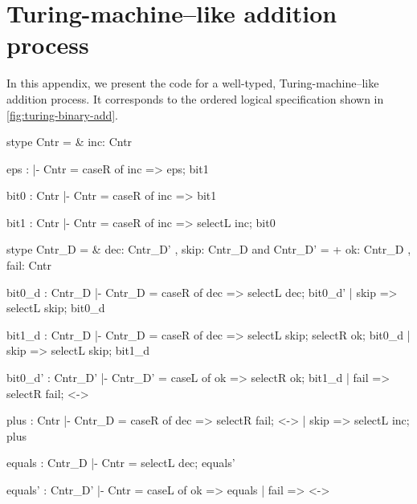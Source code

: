 \section{Turing-machine--like addition process}

In this appendix, we present the code for a well-typed, Turing-machine--like addition process.
It corresponds to the ordered logical specification shown in \cref{fig:turing-binary-add}.

\begin{sillcode*}[
  gobble=2
]
  stype Cntr = &{ inc: Cntr }
  
  eps : { |- Cntr } =
  { caseR of
      inc => eps; bit1 }
  
  bit0 : { Cntr |- Cntr } =
  { caseR of
      inc => bit1 }
  
  bit1 : { Cntr |- Cntr } =
  { caseR of
      inc => selectL inc; bit0 }

  stype Cntr_D = &{ dec: Cntr_D' , skip: Cntr_D }
    and Cntr_D' = +{ ok: Cntr_D , fail: Cntr }

  bit0_d : { Cntr_D |- Cntr_D } =
  { caseR of
      dec => selectL dec; bit0_d'
    | skip => selectL skip; bit0_d }

  bit1_d : { Cntr_D |- Cntr_D } =
  { caseR of
      dec => selectL skip; selectR ok; bit0_d
    | skip => selectL skip; bit1_d }

  bit0_d' : { Cntr_D' |- Cntr_D' } =
  { caseL of
      ok => selectR ok; bit1_d
    | fail => selectR fail; <-> }

  plus : { Cntr |- Cntr_D } =
  { caseR of
      dec => selectR fail; <->
    | skip => selectL inc; plus }

  equals : { Cntr_D |- Cntr } =
  { selectL dec; equals' }

  equals' : { Cntr_D' |- Cntr } =
  { caseL of
      ok => equals
    | fail => <-> }
\end{sillcode*}